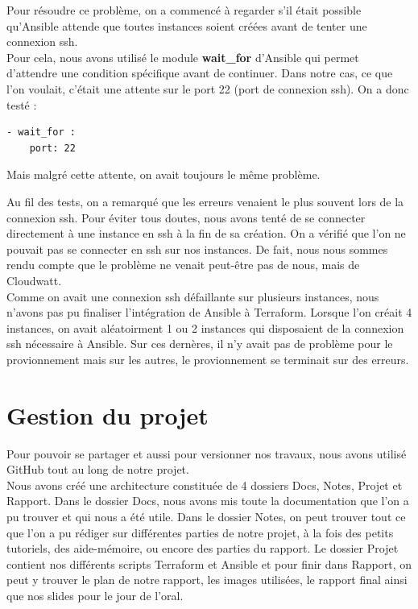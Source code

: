 \documentclass[]{article}
\begin{document}
Pour résoudre ce problème, on a commencé à regarder s'il était possible
qu'Ansible attende que toutes instances soient créées avant de tenter
une connexion ssh.\\
 Pour cela, nous avons utilisé le module
\textbf{wait\_for} d'Ansible qui permet d'attendre une condition
spécifique avant de continuer. Dans notre cas, ce que l'on voulait,
c'était une attente sur le port 22 (port de connexion ssh).
On a donc testé :
\begin{verbatim}
- wait_for :
    port: 22
\end{verbatim}
Mais malgré cette attente, on avait toujours le même problème.

Au fil des tests, on a remarqué que les erreurs venaient le plus souvent
lors de la connexion ssh. Pour éviter tous doutes, nous avons tenté de se
connecter directement à une instance en ssh à  la fin de sa création.
On a vérifié que l'on ne pouvait pas se connecter en
ssh sur nos instances. De fait, nous nous sommes rendu compte que le problème ne
venait peut-être pas de nous, mais de Cloudwatt.\\

Comme on avait une connexion ssh défaillante sur plusieurs instances, nous n'avons pas pu finaliser l'intégration de Ansible à Terraform.
Lorsque l'on créait 4 instances, on avait aléatoirment 1 ou 2 instances qui disposaient de la connexion ssh nécessaire à Ansible. Sur ces dernères, il n'y avait pas de problème pour le provionnement mais sur les autres, le provionnement se terminait sur des erreurs.
\newpage
\section{Gestion du projet}\label{ruxe9partition-des-tuxe2ches-au-seins-du-groupe}
Pour pouvoir se partager et aussi pour versionner nos travaux, nous avons utilisé GitHub tout au long de notre projet. \\
Nous avons créé une architecture constituée de 4 dossiers Docs, Notes, Projet et Rapport.
Dans le dossier Docs, nous avons mis toute la documentation que l'on a pu trouver et qui nous a été utile. Dans le dossier Notes, on peut trouver tout ce que l'on a pu rédiger sur différentes parties de notre projet, à la fois des petits tutoriels, des aide-mémoire, ou encore des parties du rapport. Le dossier Projet contient nos différents scripts Terraform et Ansible et pour finir dans Rapport, on peut y trouver le plan de notre rapport, les images utilisées, le rapport final ainsi que nos slides pour le jour de l'oral.
\end{document}
